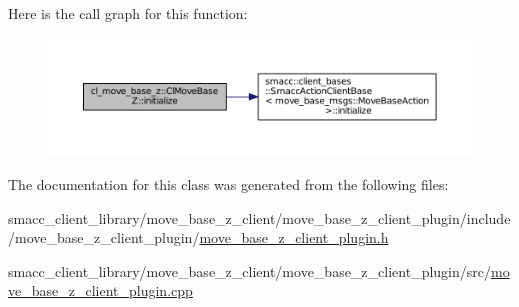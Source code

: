Here is the call graph for this function\+:
\nopagebreak
\begin{figure}[H]
\begin{center}
\leavevmode
\includegraphics[width=350pt]{classcl__move__base__z_1_1ClMoveBaseZ_a7572804edd84a956967b9f8cf2d4081e_cgraph}
\end{center}
\end{figure}




The documentation for this class was generated from the following files\+:\begin{DoxyCompactItemize}
\item 
smacc\+\_\+client\+\_\+library/move\+\_\+base\+\_\+z\+\_\+client/move\+\_\+base\+\_\+z\+\_\+client\+\_\+plugin/include/move\+\_\+base\+\_\+z\+\_\+client\+\_\+plugin/\hyperlink{move__base__z__client__plugin_8h}{move\+\_\+base\+\_\+z\+\_\+client\+\_\+plugin.\+h}\item 
smacc\+\_\+client\+\_\+library/move\+\_\+base\+\_\+z\+\_\+client/move\+\_\+base\+\_\+z\+\_\+client\+\_\+plugin/src/\hyperlink{move__base__z__client__plugin_8cpp}{move\+\_\+base\+\_\+z\+\_\+client\+\_\+plugin.\+cpp}\end{DoxyCompactItemize}
